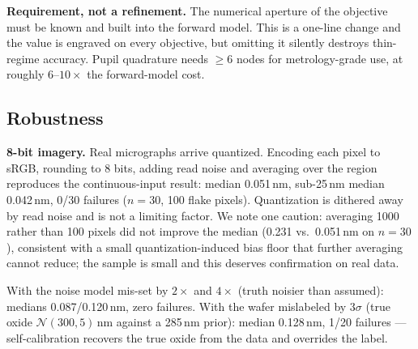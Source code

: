 \documentclass[10pt]{article}
\begin{document}
\textbf{Requirement, not a refinement.} The numerical aperture of the objective must be known and built into the forward model. This is a one-line change and the value is engraved on every objective, but omitting it silently destroys thin-regime accuracy. Pupil quadrature needs $\ge6$ nodes for metrology-grade use, at roughly $6$--$10\times$ the forward-model cost.

\subsection{Robustness}\label{sec:robust}
\textbf{8-bit imagery.} Real micrographs arrive quantized. Encoding each pixel to sRGB, rounding to 8 bits, adding read noise and averaging over the region reproduces the continuous-input result: median 0.051\,nm, sub-25\,nm median 0.042\,nm, 0/30 failures ($n{=}30$, 100 flake pixels). Quantization is dithered away by read noise and is not a limiting factor. We note one caution: averaging 1000 rather than 100 pixels did not improve the median (0.231 vs.\ 0.051\,nm on $n{=}30$), consistent with a small quantization-induced bias floor that further averaging cannot reduce; the sample is small and this deserves confirmation on real data.

With the noise model mis-set by $2\times$ and $4\times$ (truth noisier than assumed): medians 0.087/0.120\,nm, zero failures. With the wafer mislabeled by $3\sigma$ (true oxide $\mathcal{N}(300,5)$\,nm against a 285\,nm prior): median 0.128\,nm, 1/20 failures --- self-calibration recovers the true oxide from the data and overrides the label.
\end{document}
